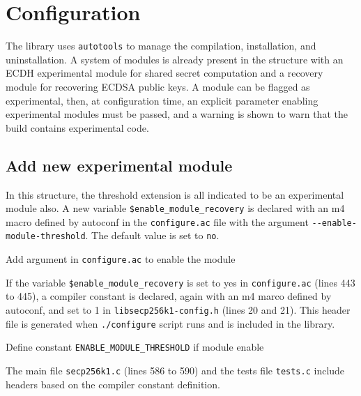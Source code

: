 \section{Configuration}

The library uses \texttt{autotools} to manage the compilation, installation, and
uninstallation. A system of modules is already present in the structure with an
ECDH experimental module for shared secret computation and a recovery module for
recovering ECDSA public keys. A module can be flagged as experimental, then, at
configuration time, an explicit parameter enabling experimental modules must be
passed, and a warning is shown to warn that the build contains experimental
code.

\subsection{Add new experimental module}

In this structure, the threshold extension is all indicated to be an
experimental module also. A new variable \texttt{\$enable\_module\_recovery} is
declared with an m4 macro defined by autoconf in the \texttt{configure.ac} file
with the argument \texttt{-{}-enable-module-threshold}. The default value is set
to \texttt{no}.

\begin{listing}
	\caption{Add argument in \texttt{configure.ac} to enable the module}
	\label{lst:configureEnableThreshold}
\end{listing}

If the variable \texttt{\$enable\_module\_recovery} is set to yes in
\texttt{configure.ac} (lines 443 to 445), a compiler constant is declared, again
with an m4 marco defined by autoconf, and set to 1 in
\texttt{libsecp256k1-config.h} (lines 20 and 21). This header file is generated
when \texttt{./configure} script runs and is included in the library.

\begin{listing}
	\caption{Define constant \texttt{ENABLE\_MODULE\_THRESHOLD} if module enable}
	\label{lst:defineEnableThreshold}
\end{listing}

The main file \texttt{secp256k1.c} (lines 586 to 590) and the tests file
\texttt{tests.c} include headers based on the compiler constant definition.

